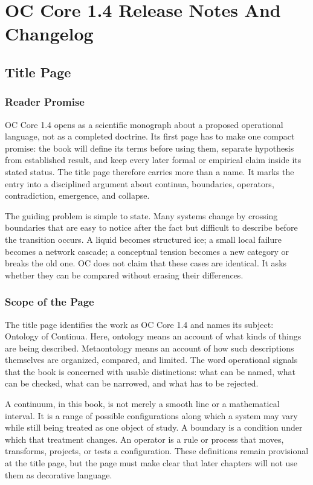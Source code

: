 \documentclass[11pt,a4paper,openany]{book}
\begin{document}
\chapter{OC Core 1.4 Release Notes And Changelog}
\section{Title Page}
\subsection{Reader Promise}
OC Core 1.4 opens as a scientific monograph about a proposed operational language, not as a completed doctrine. Its first page has to make one compact promise: the book will define its terms before using them, separate hypothesis from established result, and keep every later formal or empirical claim inside its stated status. The title page therefore carries more than a name. It marks the entry into a disciplined argument about continua, boundaries, operators, contradiction, emergence, and collapse. \cite{stauffer_percolation,grimmett_percolation}\par
The guiding problem is simple to state. Many systems change by crossing boundaries that are easy to notice after the fact but difficult to describe before the transition occurs. A liquid becomes structured ice; a small local failure becomes a network cascade; a conceptual tension becomes a new category or breaks the old one. OC does not claim that these cases are identical. It asks whether they can be compared without erasing their differences.\par
\subsection{Scope of the Page}
The title page identifies the work as OC Core 1.4 and names its subject: Ontology of Continua. Here, ontology means an account of what kinds of things are being described. Metaontology means an account of how such descriptions themselves are organized, compared, and limited. The word operational signals that the book is concerned with usable distinctions: what can be named, what can be checked, what can be narrowed, and what has to be rejected. \cite{stauffer_percolation,grimmett_percolation}\par
A continuum, in this book, is not merely a smooth line or a mathematical interval. It is a range of possible configurations along which a system may vary while still being treated as one object of study. A boundary is a condition under which that treatment changes. An operator is a rule or process that moves, transforms, projects, or tests a configuration. These definitions remain provisional at the title page, but the page must make clear that later chapters will not use them as decorative language.\par
\end{document}
